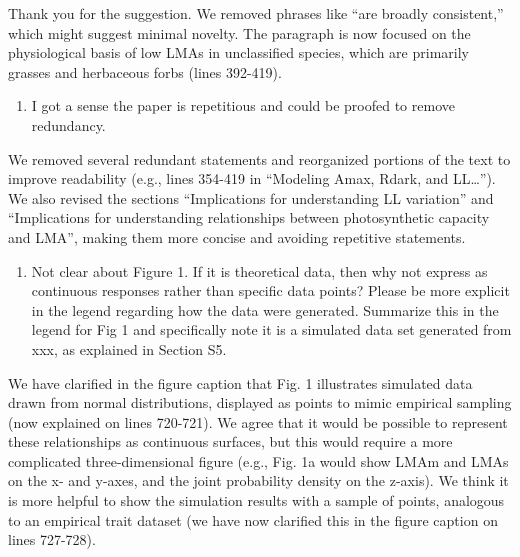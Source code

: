 \documentclass[
  12pt,
  letterpaper,
  DIV=11,
  numbers=noendperiod]{scrartcl}
\providecommand{\tightlist}{%
  \setlength{\itemsep}{0pt}\setlength{\parskip}{0pt}}\usepackage{longtable,booktabs,array}
\renewenvironment{quote}
  {\begin{customblockquote}\color{blockquote-text}\ignorespaces}
  {\end{customblockquote}}
\begin{document}
Thank you for the suggestion. We removed phrases like ``are broadly
consistent,'' which might suggest minimal novelty. The paragraph is now
focused on the physiological basis of low LMAs in unclassified species,
which are primarily grasses and herbaceous forbs (lines 392-419).

\begin{quote}
\begin{enumerate}
\def\labelenumi{\arabic{enumi})}
\setcounter{enumi}{4}
\tightlist
\item
  I got a sense the paper is repetitious and could be proofed to remove
  redundancy.
\end{enumerate}
\end{quote}

We removed several redundant statements and reorganized portions of the
text to improve readability (e.g., lines 354-419 in ``Modeling Amax,
Rdark, and LL\ldots{}''). We also revised the sections ``Implications
for understanding LL variation'' and ``Implications for understanding
relationships between photosynthetic capacity and LMA'', making them
more concise and avoiding repetitive statements.

\begin{quote}
\begin{enumerate}
\def\labelenumi{\arabic{enumi})}
\setcounter{enumi}{5}
\tightlist
\item
  Not clear about Figure 1. If it is theoretical data, then why not
  express as continuous responses rather than specific data points?
  Please be more explicit in the legend regarding how the data were
  generated. Summarize this in the legend for Fig 1 and specifically
  note it is a simulated data set generated from xxx, as explained in
  Section S5.
\end{enumerate}
\end{quote}

We have clarified in the figure caption that Fig. 1 illustrates
simulated data drawn from normal distributions, displayed as points to
mimic empirical sampling (now explained on lines 720-721). We agree that
it would be possible to represent these relationships as continuous
surfaces, but this would require a more complicated three-dimensional
figure (e.g., Fig. 1a would show LMAm and LMAs on the x- and y-axes, and
the joint probability density on the z-axis). We think it is more
helpful to show the simulation results with a sample of points,
analogous to an empirical trait dataset (we have now clarified this in
the figure caption on lines 727-728).
\end{document}
